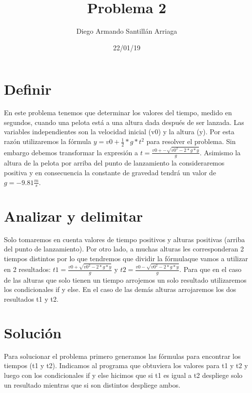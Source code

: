 \documentclass[letterpaper, 12pt, oneside]{article}%
\title{\Huge Problema 2}
\author{Diego Armando Santillán Arriaga}
\date{22/01/19}
\begin{document}
\maketitle
\newpage
\section*{Definir}
En este problema tenemos que determinar los valores del tiempo, medido en segundos, cuando una pelota está a una altura dada después de ser lanzada. Las variables independientes son la velocidad inicial (v0) y la altura (y). Por esta razón utilizaremos la fórmula $y = v0 + \frac{1}{2}*g*t^{2}$ para resolver el problema. Sin embargo debemos transformar la expresión a $ t = \frac{v0 +- \sqrt{{v0}^{2}-2*g*y}}{g} $. Asimismo la altura de la pelota por arriba del punto de lanzamiento la consideraremos positiva y en consecuencia la constante de gravedad tendrá un valor de $g=-9.81 \frac{m}{s}$.  
\section*{Analizar y delimitar}
Solo tomaremos en cuenta valores de tiempo positivos y alturas positivas (arriba del punto de lanzamiento). Por otro lado, a muchas alturas les corresponderan 2 tiempos distintos por lo que tendremos que dividir la fórmulaque vamos a utilizar en 2 resultados: $ t1 = \frac{v0 + \sqrt{{v0}^{2}-2*g*y}}{g} $ y $ t2 = \frac{v0 - \sqrt{{v0}^{2}-2*g*y}}{g} $. Para que en el caso de las alturas que solo tienen un tiempo arrojemos un solo resultado utilizaremos los condicionales if y else. En el caso de las demás alturas arrojaremos los dos resultados t1 y t2.

\section*{Solución}
Para solucionar el problema primero generamos las fórmulas para encontrar los tiempos (t1 y t2). Indicamos al programa que obtuviera los valores para t1 y t2 y luego con los condicionales if y else hicimos que si t1 es igual a t2 despliege solo un resultado mientras que si son distintos despliege ambos. 

	
\end{document}
